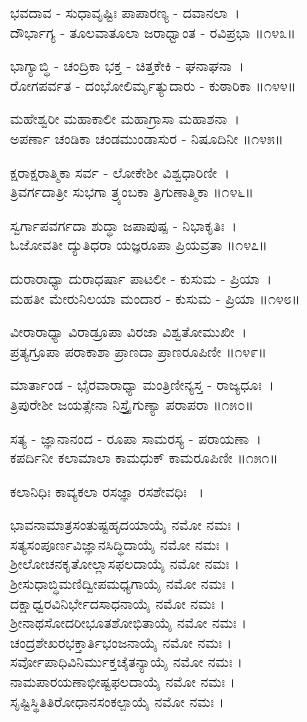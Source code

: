 ಭವದಾವ - ಸುಧಾವೃಷ್ಟಿಃ ಪಾಪಾರಣ್ಯ - ದವಾನಲಾ~।\\
ದೌರ್ಭಾಗ್ಯ - ತೂಲವಾತೂಲಾ ಜರಾಧ್ವಾಂತ - ರವಿಪ್ರಭಾ ॥೧೪೩॥

ಭಾಗ್ಯಾಬ್ಧಿ - ಚಂದ್ರಿಕಾ ಭಕ್ತ - ಚಿತ್ತಕೇಕಿ - ಘನಾಘನಾ~।\\
ರೋಗಪರ್ವತ - ದಂಭೋಲಿರ್ಮೃತ್ಯುದಾರು - ಕುಠಾರಿಕಾ ॥೧೪೪॥

ಮಹೇಶ್ವರೀ ಮಹಾಕಾಲೀ ಮಹಾಗ್ರಾಸಾ ಮಹಾಶನಾ~।\\
ಅಪರ್ಣಾ ಚಂಡಿಕಾ ಚಂಡಮುಂಡಾಸುರ - ನಿಷೂದಿನೀ ॥೧೪೫॥

ಕ್ಷರಾಕ್ಷರಾತ್ಮಿಕಾ ಸರ್ವ - ಲೋಕೇಶೀ ವಿಶ್ವಧಾರಿಣೀ~।\\
ತ್ರಿವರ್ಗದಾತ್ರೀ ಸುಭಗಾ ತ್ರ್ಯಂಬಕಾ ತ್ರಿಗುಣಾತ್ಮಿಕಾ ॥೧೪೬॥

ಸ್ವರ್ಗಾಪವರ್ಗದಾ ಶುದ್ಧಾ ಜಪಾಪುಷ್ಪ - ನಿಭಾಕೃತಿಃ~।\\
ಓಜೋವತೀ ದ್ಯುತಿಧರಾ ಯಜ್ಞರೂಪಾ ಪ್ರಿಯವ್ರತಾ ॥೧೪೭॥

ದುರಾರಾಧ್ಯಾ ದುರಾಧರ್ಷಾ ಪಾಟಲೀ - ಕುಸುಮ - ಪ್ರಿಯಾ~।\\
ಮಹತೀ ಮೇರುನಿಲಯಾ ಮಂದಾರ - ಕುಸುಮ - ಪ್ರಿಯಾ ॥೧೪೮॥

ವೀರಾರಾಧ್ಯಾ ವಿರಾಡ್ರೂಪಾ ವಿರಜಾ ವಿಶ್ವತೋಮುಖೀ~।\\
ಪ್ರತ್ಯಗ್ರೂಪಾ ಪರಾಕಾಶಾ ಪ್ರಾಣದಾ ಪ್ರಾಣರೂಪಿಣೀ ॥೧೪೯॥

ಮಾರ್ತಾಂಡ - ಭೈರವಾರಾಧ್ಯಾ ಮಂತ್ರಿಣೀನ್ಯಸ್ತ - ರಾಜ್ಯಧೂಃ~।\\
ತ್ರಿಪುರೇಶೀ ಜಯತ್ಸೇನಾ ನಿಸ್ತ್ರೈಗುಣ್ಯಾ ಪರಾಪರಾ ॥೧೫೦॥

ಸತ್ಯ - ಜ್ಞಾನಾನಂದ - ರೂಪಾ ಸಾಮರಸ್ಯ - ಪರಾಯಣಾ~।\\
ಕಪರ್ದಿನೀ ಕಲಾಮಾಲಾ ಕಾಮಧುಕ್ ಕಾಮರೂಪಿಣೀ ॥೧೫೧॥

ಕಲಾನಿಧಿಃ ಕಾವ್ಯಕಲಾ ರಸಜ್ಞಾ ರಸಶೇವಧಿಃ ~।

ಭಾವನಾಮಾತ್ರಸಂತುಷ್ಟಹೃದಯಾಯೈ ನಮೋ ನಮಃ ।\\
ಸತ್ಯಸಂಪೂರ್ಣವಿಜ್ಞಾನಸಿದ್ಧಿದಾಯೈ ನಮೋ ನಮಃ ।\\
ಶ್ರೀಲೋಚನಕೃತೋಲ್ಲಾಸಫಲದಾಯೈ ನಮೋ ನಮಃ ।\\
ಶ್ರೀಸುಧಾಬ್ಧಿಮಣಿದ್ವೀಪಮಧ್ಯಗಾಯೈ ನಮೋ ನಮಃ ।\\
ದಕ್ಷಾಧ್ವರವಿನಿರ್ಭೇದಸಾಧನಾಯೈ ನಮೋ ನಮಃ ।\\
ಶ್ರೀನಾಥಸೋದರೀಭೂತಶೋಭಿತಾಯೈ ನಮೋ ನಮಃ ।\\
ಚಂದ್ರಶೇಖರಭಕ್ತಾರ್ತಿಭಂಜನಾಯೈ ನಮೋ ನಮಃ ।\\
ಸರ್ವೋಪಾಧಿವಿನಿರ್ಮುಕ್ತಚೈತನ್ಯಾಯೈ ನಮೋ ನಮಃ ।\\
ನಾಮಪಾರಯಣಾಭೀಷ್ಟಫಲದಾಯೈ ನಮೋ ನಮಃ ।\\
ಸೃಷ್ಟಿಸ್ಥಿತಿತಿರೋಧಾನಸಂಕಲ್ಪಾಯೈ ನಮೋ ನಮಃ ।



